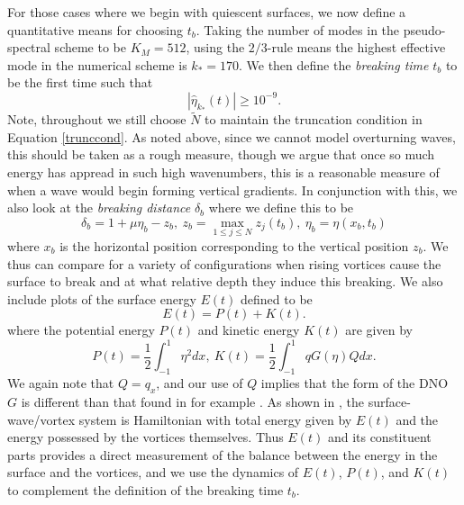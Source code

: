 \documentclass[a4paper,11pt]{article}
\begin{document}
For those cases where we begin with quiescent surfaces, we now define a quantitative means for choosing $t_{b}$. Taking the number of modes in the pseudo-spectral scheme to be $K_{M}=512$, using the $2/3$-rule means the highest effective mode in the numerical scheme is $k_{\ast}=170$.  We then define the {\it breaking time} $t_{b}$ to be the first time such that
\[
\left|\hat{\eta}_{k_{\ast}}(t)\right| \geq 10^{-9}.  
\]
Note, throughout we still choose $\tilde{N}$ to maintain the truncation condition in Equation \eqref{trunccond}.  As noted above, since we cannot model overturning waves, this should be taken as a rough measure, though we argue that once so much energy has appread in such high wavenumbers, this is a reasonable measure of when a wave would begin forming vertical gradients.  In conjunction with this, we also look at the {\it breaking distance} $\delta_{b}$ where we define this to be 
\[
\delta_{b} = 1 + \mu\eta_{b} - z_{b}, ~ z_{b} = \max_{1\leq j \leq N} z_{j}(t_{b}), ~ \eta_{b} = \eta(x_{b},t_{b})
\]
where $x_{b}$ is the horizontal position corresponding to the vertical position $z_{b}$.  We thus can compare for a variety of configurations when rising vortices cause the surface to break and at what relative depth they induce this breaking.  We also include plots of the surface energy $E(t)$ defined to be 
\[
E(t) = P(t) + K(t).
\] 
where the potential energy $P(t)$ and kinetic energy $K(t)$ are given by 
\[
P(t) =  \frac{1}{2}\int_{-1}^{1}\eta^{2}dx, ~ K(t) = \frac{1}{2}\int_{-1}^{1} q G(\eta)Q dx.
\]
We again note that $Q = q_{x}$, and our use of $Q$ implies that the form of the DNO $G$ is different than that found in for example \cite{craig}.  As shown in \cite{rouhi}, the surface-wave/vortex system is Hamiltonian with total energy given by $E(t)$ and the energy possessed by the vortices themselves.  Thus $E(t)$ and its constituent parts provides a direct measurement of the balance between the energy in the surface and the vortices, and we use the dynamics of $E(t)$, $P(t)$, and $K(t)$ to complement the definition of the breaking time $t_{b}$.   

\end{document}
